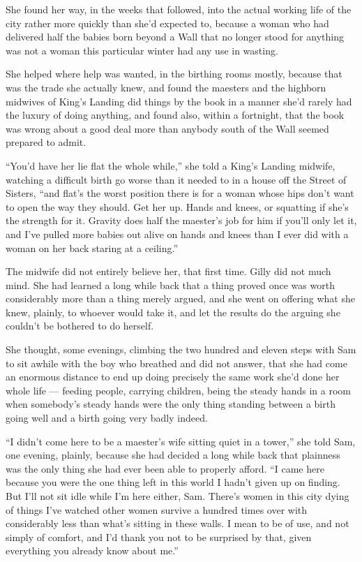 \sceneBreak

She found her way, in the weeks that followed, into the actual working life of the city rather more quickly than she’d expected to, because a woman who had delivered half the babies born beyond a Wall that no longer stood for anything was not a woman this particular winter had any use in wasting.

She helped where help was wanted, in the birthing rooms mostly, because that was the trade she actually knew, and found the maesters and the highborn midwives of King’s Landing did things by the book in a manner she’d rarely had the luxury of doing anything, and found also, within a fortnight, that the book was wrong about a good deal more than anybody south of the Wall seemed prepared to admit.

“You’d have her lie flat the whole while,” she told a King’s Landing midwife, watching a difficult birth go worse than it needed to in a house off the Street of Sisters, “and flat’s the worst position there is for a woman whose hips don’t want to open the way they should. Get her up. Hands and knees, or squatting if she’s the strength for it. Gravity does half the maester’s job for him if you’ll only let it, and I’ve pulled more babies out alive on hands and knees than I ever did with a woman on her back staring at a ceiling.”

The midwife did not entirely believe her, that first time. Gilly did not much mind. She had learned a long while back that a thing proved once was worth considerably more than a thing merely argued, and she went on offering what she knew, plainly, to whoever would take it, and let the results do the arguing she couldn’t be bothered to do herself.

\sceneBreak

She thought, some evenings, climbing the two hundred and eleven steps with Sam to sit awhile with the boy who breathed and did not answer, that she had come an enormous distance to end up doing precisely the same work she’d done her whole life — feeding people, carrying children, being the steady hands in a room when somebody’s steady hands were the only thing standing between a birth going well and a birth going very badly indeed.

“I didn’t come here to be a maester’s wife sitting quiet in a tower,” she told Sam, one evening, plainly, because she had decided a long while back that plainness was the only thing she had ever been able to properly afford. “I came here because you were the one thing left in this world I hadn’t given up on finding. But I’ll not sit idle while I’m here either, Sam. There’s women in this city dying of things I’ve watched other women survive a hundred times over with considerably less than what’s sitting in these walls. I mean to be of use, and not simply of comfort, and I’d thank you not to be surprised by that, given everything you already know about me.”

